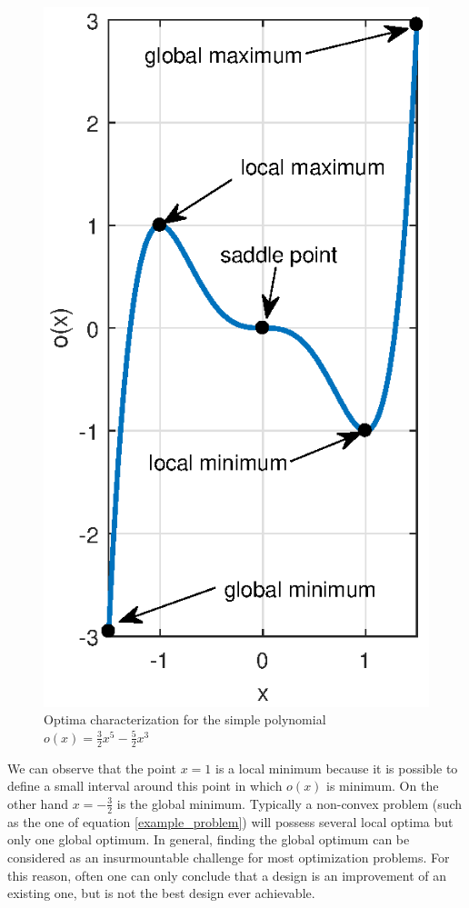 \begin{figure}[ht]
\centering
\includegraphics[width=12cm]{images/Ch2/example_minimum_maximum}
\caption{Optima characterization for the simple polynomial $o(x)=\frac{3}{2}x^5-\frac{5}{2}x^3$}
\label{fig.2.4b}
\end{figure}
We can observe that the point $x=1$ is a local minimum because it is possible to define a small interval around this point in which $o(x)$ is minimum. On the other hand $x=-\frac{3}{2}$ is the global minimum.
 Typically a non-convex problem (such as the one of equation \eqref{example_problem}) will possess several local optima but only one global optimum. In general, finding the global optimum can be considered as an insurmountable challenge for most optimization problems. For this reason, often one can only conclude that a design is an improvement of an existing one, but is not the best design ever achievable. 
